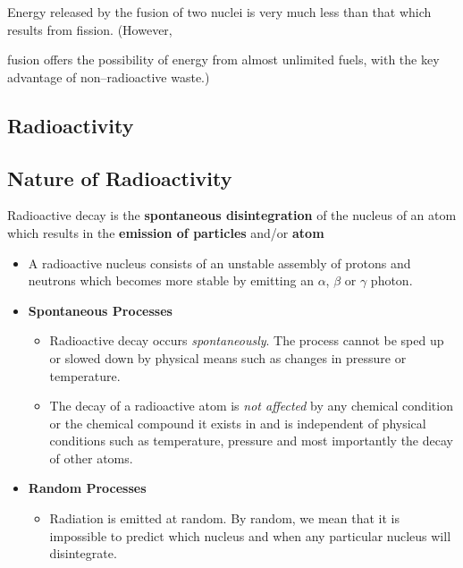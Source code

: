 Energy released by the fusion of two nuclei is very much less than that which results from fission. (However, {fusion offers the possibility of energy from almost unlimited fuels, with the key advantage of non--radioactive waste.)

\subsection{Radioactivity}
\subsection{Nature of Radioactivity}
\begin{defi}
Radioactive decay is the \textbf{spontaneous disintegration} of the nucleus of an atom which results in the \textbf{emission of particles} and/or \textbf{atom}
\end{defi}

\begin{itemize}
\item A radioactive nucleus consists of an unstable assembly of protons and neutrons which becomes more stable by emitting an $\alpha$, $\beta$ or $\gamma$ photon.
\item \textbf{Spontaneous Processes}
	\begin{itemize}
	\item Radioactive decay occurs \emph{spontaneously}. The process cannot be sped up or slowed down by physical means such as changes in pressure or temperature.
	\item The decay of a radioactive atom is \emph{not affected} by any chemical condition or the chemical compound it exists in and is independent of physical conditions such as temperature, pressure and most importantly the decay of other atoms.
	\end{itemize}
\item \textbf{Random Processes}
	\begin{itemize}
	\item Radiation is emitted at random. By random, we mean that it is impossible to predict which nucleus and when any particular nucleus will disintegrate.
	\end{itemize}
\end{itemize}

}
